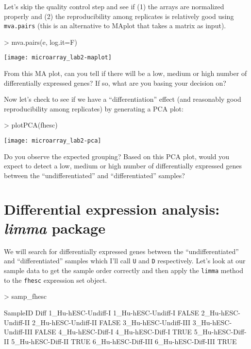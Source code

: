 \documentclass[12pt]{article}
\newcommand{\code}[1]{{\texttt{#1}}}
\begin{document}
Let's skip the quality control step and see if (1) the arrays are normalized properly and (2) the reproducibility among replicates is relatively good using \code{mva.pairs} (this is an alternative to MAplot that takes a matrix as input). 

\begin{Schunk}
\begin{Sinput}
> mva.pairs(e, log.it=F)
\end{Sinput}
\end{Schunk}
\texttt{[image: microarray\_lab2-maplot]}

From this MA plot, can you tell if there will be a low, medium or high number of differentially expressed genes?  If so, what are you basing your decision on?

Now let's check to see if we have a ``differentiation'' effect (and reasonably good reproducibility among replicates) by generating a PCA plot:

\begin{Schunk}
\begin{Sinput}
> plotPCA(fhesc)
\end{Sinput}
\end{Schunk}
\texttt{[image: microarray\_lab2-pca]}

Do you observe the expected grouping?  Based on this PCA plot, would you expect to detect a low, medium or high number of differentially expressed genes between the ``undifferentiated'' and ``differentiated'' samples? 

\section{Differential expression analysis: {\it limma} package}

We will search for differentially expressed genes between the ``undifferentiated'' and ``differentiated'' samples which I'll call \code{U} and \code{D} respectively.  Let's look at our sample data to get the sample order correctly and then apply the \code{limma} method to the \code{fhesc} expression set object.

\begin{Schunk}
\begin{Sinput}
> samp_fhesc
\end{Sinput}
\begin{Soutput}
                                 SampleID  Diff
1_Hu-hESC-Undiff-I     1_Hu-hESC-Undiff-I FALSE
2_Hu-hESC-Undiff-II   2_Hu-hESC-Undiff-II FALSE
3_Hu-hESC-Undiff-III 3_Hu-hESC-Undiff-III FALSE
4_Hu-hESC-Diff-I         4_Hu-hESC-Diff-I  TRUE
5_Hu-hESC-Diff-II       5_Hu-hESC-Diff-II  TRUE
6_Hu-hESC-Diff-III     6_Hu-hESC-Diff-III  TRUE
\end{Soutput}
\end{Schunk}
\end{document}
